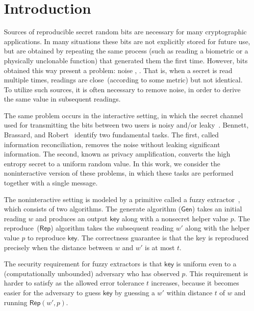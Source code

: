 \documentclass[11pt]{article}
\newcommand{\class}[1]{{\ensuremath{\mathsf{#1}}}}
\newcommand{\key}{\ensuremath{\class{key}}\xspace}
\newcommand{\gen}{\ensuremath{\class{Gen}}\xspace}
\newcommand{\rep}{\ensuremath{\class{Rep}}\xspace}
\begin{document}
\section{Introduction}
Sources of reproducible secret random bits are necessary for many cryptographic applications.  In many situations these bits are not explicitly stored for future use, but are obtained by repeating the same process  (such as reading a biometric or a physically unclonable function) that generated them the first time.
However, bits obtained this way present a problem: noise \cite{daugman2004,zviran1993comparison,brostoff2000passfaces,ellison2000protecting,mayrhofer2009shake}, \cite{monrose2002password,pappu2002physical,gassend2002silicon,tuyls2006puf,suh2007physical,bennett1988privacy}.  That is, when a secret is read multiple times, readings are close~(according to some metric) but not identical.  To utilize such sources, it is often necessary to remove noise, in order to derive the same value in subsequent readings.

The same problem occurs in the interactive setting, in which the secret channel used for transmitting the bits between two users is noisy and/or leaky~\cite{wyner1975wire}. Bennett, Brassard, and Robert~\cite{bennett1988privacy} identify two fundamental tasks.  The first, called information reconciliation, removes the noise without leaking significant information. The second, known as privacy amplification, converts the high entropy secret to a uniform random value.  In this work, we consider the noninteractive version of these problems, in which these tasks are performed together with a single message.

The noninteractive setting is modeled by a primitive called a fuzzy extractor~\cite{DBLP:journals/siamcomp/DodisORS08}, which consists of two algorithms.  %
The  generate algorithm ($\gen$)  takes an initial reading $w$ and produces an output $\key$ along with a nonsecret helper value $p$.  The reproduce~($\rep$) algorithm takes the subsequent reading $w'$ along with the helper value $p$ to reproduce $\key$.   The correctness guarantee is that the key is reproduced precisely when the distance between $w$ and $w'$ is at most $t$. 

The security requirement for fuzzy extractors is that $\key$ is uniform even to a (computationally unbounded) adversary who has observed $p$.   This requirement is  harder to satisfy as the allowed error tolerance $t$ increases, because it becomes easier for the adversary to guess $\key$ by guessing a $w'$ within distance $t$ of $w$ and running $\rep(w',p)$.
\end{document}
